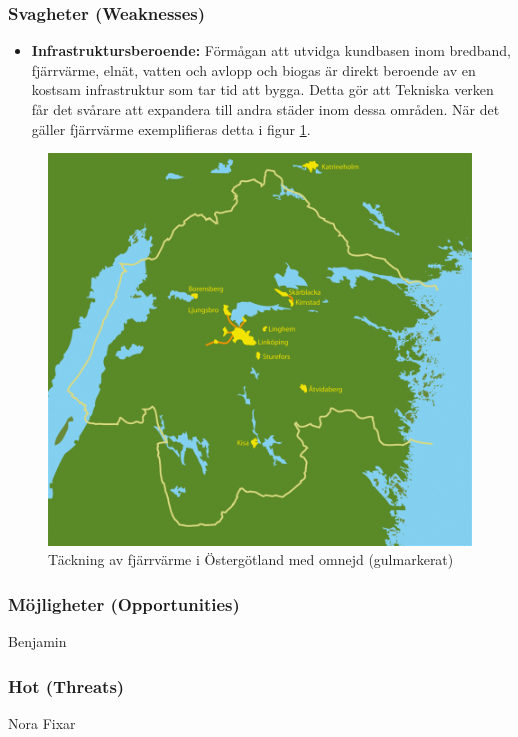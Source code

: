 \documentclass[10pt,a4paper]{article}
\begin{document}
\subsubsection{Svagheter (Weaknesses)}
\begin{itemize}
	\item \textbf{Infrastruktursberoende:}
		Förmågan att utvidga kundbasen inom bredband, fjärrvärme, elnät, vatten och avlopp och biogas är direkt beroende av en kostsam infrastruktur som tar tid att bygga. Detta gör att Tekniska verken får det svårare att expandera till andra städer inom dessa områden. När det gäller fjärrvärme exemplifieras detta i figur \ref{fig:fjarr}.
		
\end{itemize}
\begin{figure}[H] 
\centerline{\includegraphics[scale=0.5]{Bilder/teckning_fjarrvarme.png}}
\caption{Täckning av fjärrvärme i Östergötland med omnejd (gulmarkerat)}
\label{fig:fjarr}
\end{figure}  


\subsubsection{Möjligheter (Opportunities)}
Benjamin


\subsubsection{Hot (Threats)}
Nora Fixar
\end{document}
